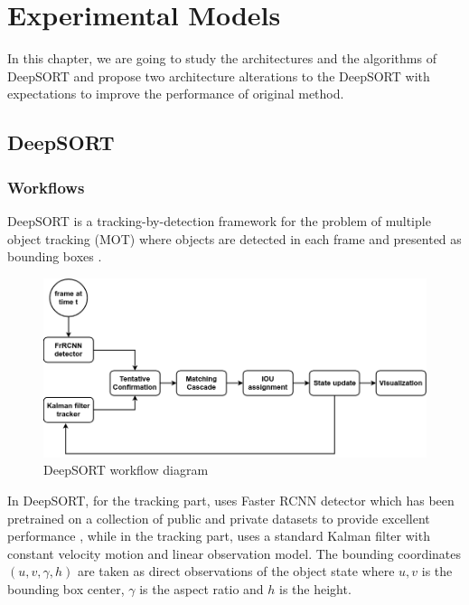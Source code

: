 \chapter{Experimental Models}
\label{Chap:3}
\hspace{0.5cm} In this chapter, we are going to study the architectures and the algorithms of DeepSORT\cite{Wojke2017simple}
and propose two architecture alterations to the DeepSORT\cite{Wojke2017simple} with expectations to improve the performance of original method.

\section{DeepSORT}
\subsection{Workflows}
\hspace{0.5cm} DeepSORT\cite{Wojke2017simple} is a tracking-by-detection framework for the problem of multiple 
object tracking (MOT) where objects are detected in each frame and presented as bounding boxes \cite{sort}.\par
\begin{figure}[h!]
    \centering
    \includegraphics[width=\textwidth]{Chapters/Fig/Thesis_diagram-DeepSORT.png}
    \caption{DeepSORT workflow diagram}
    \label{fig:deepsort_workflow}
\end{figure}
In DeepSORT, for the tracking part, \cite{Wojke2017simple} uses Faster \acrshort{RCNN} detector which has been pretrained on a collection of public and private datasets to provide excellent performance \cite{Wojke2017simple}, while in the tracking part, \cite{Wojke2017simple} uses a standard Kalman filter with constant velocity motion and linear observation model. The bounding coordinates $(u,v,\gamma,h)$ are taken as direct observations of the object state where $u,v$ is the bounding box center, $\gamma$ is the aspect ratio and $h$ is the height.\par
